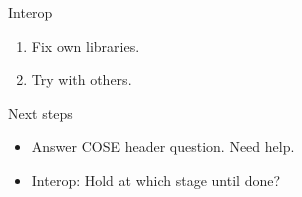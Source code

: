 \begin{frame}{Interop}\Large
  \begin{enumerate}
    \item Fix own libraries.
    \item Try with others.
  \end{enumerate}
\end{frame}

\begin{frame}{Next steps}\Large
  \begin{itemize}
    \item Answer COSE header question. Need help.
      \bigskip
    \item Interop: Hold at which stage until done?
  \end{itemize}
\end{frame}


